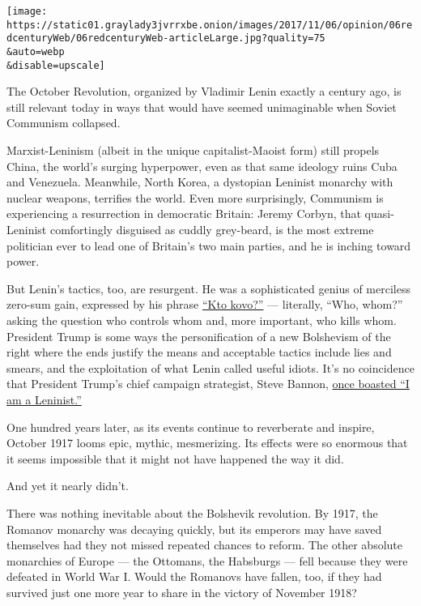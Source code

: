 \texttt{[image: https://static01.graylady3jvrrxbe.onion/images/2017/11/06/opinion/06redcenturyWeb/06redcenturyWeb-articleLarge.jpg?quality=75\\\&auto=webp\\\&disable=upscale]}

The October Revolution, organized by Vladimir Lenin exactly a century
ago, is still relevant today in ways that would have seemed unimaginable
when Soviet Communism collapsed.

Marxist-Leninism (albeit in the unique capitalist-Maoist form) still
propels China, the world's surging hyperpower, even as that same
ideology ruins Cuba and Venezuela. Meanwhile, North Korea, a dystopian
Leninist monarchy with nuclear weapons, terrifies the world. Even more
surprisingly, Communism is experiencing a resurrection in democratic
Britain: Jeremy Corbyn, that quasi-Leninist comfortingly disguised as
cuddly grey-beard, is the most extreme politician ever to lead one of
Britain's two main parties, and he is inching toward power.

But Lenin's tactics, too, are resurgent. He was a sophisticated genius
of merciless zero-sum gain, expressed by his phrase
\href{https://en.wikipedia.org/wiki/Who,_whom\%3F}{``Kto kovo?''} ---
literally, ``Who, whom?'' asking the question who controls whom and,
more important, who kills whom. President Trump is some ways the
personification of a new Bolshevism of the right where the ends justify
the means and acceptable tactics include lies and smears, and the
exploitation of what Lenin called useful idiots. It's no coincidence
that President Trump's chief campaign strategist, Steve Bannon,
\href{https://www.thedailybeast.com/steve-bannon-trumps-top-guy-told-me-he-was-a-leninist}{once
boasted ``I am a Leninist.''}

One hundred years later, as its events continue to reverberate and
inspire, October 1917 looms epic, mythic, mesmerizing. Its effects were
so enormous that it seems impossible that it might not have happened the
way it did.

And yet it nearly didn't.

There was nothing inevitable about the Bolshevik revolution. By 1917,
the Romanov monarchy was decaying quickly, but its emperors may have
saved themselves had they not missed repeated chances to reform. The
other absolute monarchies of Europe --- the Ottomans, the Habsburgs ---
fell because they were defeated in World War I. Would the Romanovs have
fallen, too, if they had survived just one more year to share in the
victory of November 1918?

